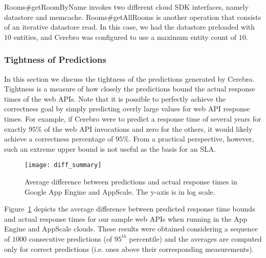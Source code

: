 Rooms\#getRoomByName
invokes two different cloud SDK interfaces, namely datastore and memcache.
Rooms\#get\-AllRooms is another operation that consists of an iterative
datastore read. In this case, we had the datastore preloaded with $10$ entities,
and Cerebro was configured to use a maximum entity count of $10$. 

\subsubsection{Tightness of Predictions}

In this section we discuss the tightness of the predictions generated by Cerebro. 
Tightness is a measure of how closely the predictions
bound the actual response times of the web APIs. 
Note that it is possible to perfectly achieve the correctness goal
by simply predicting overly large values for web API response times. For example, if Cerebro were to
predict a response time of several years for exactly $95\%$ of the web API
invocations and zero for the others, it would likely
achieve a correctness percentage of $95\%$.  From a practical perspective,
however, such an extreme upper bound is not useful as the basis for an SLA. 

\begin{figure}
\centering
\texttt{[image: diff\_summary]}
\caption{Average difference between predictions and actual response times in
Google App Engine and AppScale. The y-axis is in log scale.}
\label{fig:diff_summary}
\end{figure}

Figure~\ref{fig:diff_summary} depicts the average difference between predicted
response time bounds and actual response times for
our sample web APIs when running in the App Engine and AppScale clouds. 
These results were obtained considering a sequence of $1000$ 
consecutive predictions (of $95^{th}$ percentile) and the averages are
computed only for correct predictions (i.e. ones above their corresponding
measurements).

